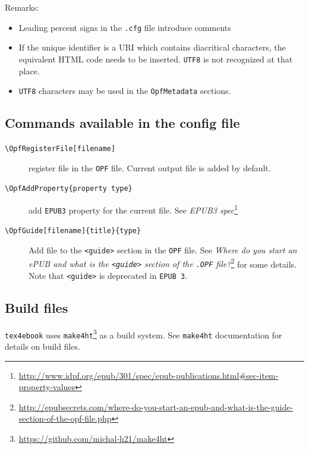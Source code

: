 Remarks:

\begin{itemize}
\tightlist
\item
  Leading percent signs in the \texttt{.cfg} file introduce comments
\item
  If the unique identifier is a URI which contains diacritical
  characters, the\\
  equivalent HTML code needs to be inserted. \texttt{UTF8} is not
  recognized at that place.
\item
  \texttt{UTF8} characters may be used in the \texttt{OpfMetadata}
  sections.
\end{itemize}

\hypertarget{commands-available-in-the-config-file}{%
\subsection{Commands available in the config
file}\label{commands-available-in-the-config-file}}

\begin{description}
\item[\texttt{\textbackslash{}OpfRegisterFile{[}filename{]}}]
register file in the \texttt{OPF} file. Current output file is added by
default.
\item[\texttt{\textbackslash{}OpfAddProperty\{property\ type\}}]
add \texttt{EPUB3} property for the current file. See \emph{EPUB3
spec}\footnote{\url{http://www.idpf.org/epub/301/spec/epub-publications.html\#sec-item-property-values}}
\item[\texttt{\textbackslash{}OpfGuide{[}filename{]}\{title\}\{type\}}]
Add file to the \texttt{\textless{}guide\textgreater{}} section in the
\texttt{OPF} file. See \emph{Where do you start an ePUB and what is the
\texttt{\textless{}guide\textgreater{}} section of the \texttt{.OPF}
file?}\footnote{\url{http://epubsecrets.com/where-do-you-start-an-epub-and-what-is-the-guide-section-of-the-opf-file.php}}
for some details. Note that \texttt{\textless{}guide\textgreater{}} is
deprecated in \texttt{EPUB\ 3}.
\end{description}

\hypertarget{build-files}{%
\subsection{Build files}\label{build-files}}

\texttt{tex4ebook} uses \texttt{make4ht}\footnote{\url{https://github.com/michal-h21/make4ht}}
as a build system. See \texttt{make4ht} documentation for details on
build files.

